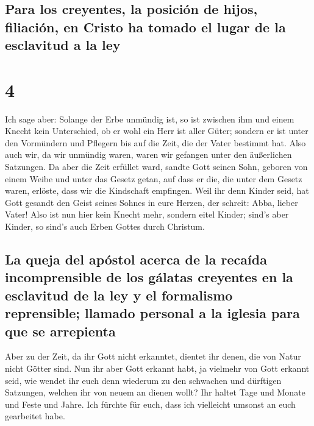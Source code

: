 \hypertarget{para-los-creyentes-la-posiciuxf3n-de-hijos-filiaciuxf3n-en-cristo-ha-tomado-el-lugar-de-la-esclavitud-a-la-ley}{%
\subsection{Para los creyentes, la posición de hijos, filiación, en
Cristo ha tomado el lugar de la esclavitud a la
ley}\label{para-los-creyentes-la-posiciuxf3n-de-hijos-filiaciuxf3n-en-cristo-ha-tomado-el-lugar-de-la-esclavitud-a-la-ley}}

\hypertarget{section-3}{%
\section{4}\label{section-3}}

 Ich sage aber: Solange der Erbe unmündig ist, so ist
zwischen ihm und einem Knecht kein Unterschied, ob er wohl ein Herr ist
aller Güter;  sondern er ist unter den Vormündern und
Pflegern bis auf die Zeit, die der Vater bestimmt hat. 
Also auch wir, da wir unmündig waren, waren wir gefangen unter den
äußerlichen Satzungen.  Da aber die Zeit erfüllet ward,
sandte Gott seinen Sohn, geboren von einem Weibe und unter das Gesetz
getan,  auf dass er die, die unter dem Gesetz waren,
erlöste, dass wir die Kindschaft empfingen.  Weil ihr denn
Kinder seid, hat Gott gesandt den Geist seines Sohnes in eure Herzen,
der schreit: Abba, lieber Vater!  Also ist nun hier kein
Knecht mehr, sondern eitel Kinder; sind's aber Kinder, so sind's auch
Erben Gottes durch Christum.

\hypertarget{la-queja-del-apuxf3stol-acerca-de-la-recauxedda-incomprensible-de-los-guxe1latas-creyentes-en-la-esclavitud-de-la-ley-y-el-formalismo-reprensible-llamado-personal-a-la-iglesia-para-que-se-arrepienta}{%
\subsection{La queja del apóstol acerca de la recaída incomprensible de
los gálatas creyentes en la esclavitud de la ley y el formalismo
reprensible; llamado personal a la iglesia para que se
arrepienta}\label{la-queja-del-apuxf3stol-acerca-de-la-recauxedda-incomprensible-de-los-guxe1latas-creyentes-en-la-esclavitud-de-la-ley-y-el-formalismo-reprensible-llamado-personal-a-la-iglesia-para-que-se-arrepienta}}

 Aber zu der Zeit, da ihr Gott nicht erkanntet, dientet
ihr denen, die von Natur nicht Götter sind.  Nun ihr aber
Gott erkannt habt, ja vielmehr von Gott erkannt seid, wie wendet ihr
euch denn wiederum zu den schwachen und dürftigen Satzungen, welchen ihr
von neuem an dienen wollt?  Ihr haltet Tage und Monate
und Feste und Jahre.  Ich fürchte für euch, dass ich
vielleicht umsonst an euch gearbeitet habe.

